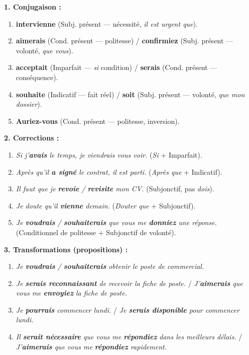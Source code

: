 \documentclass[11pt]{article}
\begin{document}
\begin{corrige}
\textbf{1. Conjugaison :}
\begin{enumerate}
    \item \textbf{intervienne} (Subj. présent — nécessité, \emph{il est urgent que}).
    \item \textbf{aimerais} (Cond. présent — politesse) / \textbf{confirmiez} (Subj. présent — volonté, \emph{que vous}).
    \item \textbf{acceptait} (Imparfait — \emph{si} condition) / \textbf{serais} (Cond. présent — conséquence).
    \item \textbf{souhaite} (Indicatif — fait réel) / \textbf{soit} (Subj. présent — volonté, \emph{que mon dossier}).
    \item \textbf{Auriez-vous} (Cond. présent — politesse, inversion).
\end{enumerate}

\textbf{2. Corrections :}
\begin{enumerate}
    \item \emph{Si j'\textbf{avais} le temps, je viendrais vous voir.} (\emph{Si} + Imparfait).
    \item \emph{Après qu'il \textbf{a signé} le contrat, il est parti.} (\emph{Après que} + Indicatif).
    \item \emph{Il faut que je \textbf{revoie} / \textbf{revisite} mon CV.} (Subjonctif, pas \emph{dois}).
    \item \emph{Je doute qu'il \textbf{vienne} demain.} (\emph{Douter que} + Subjonctif).
    \item \emph{Je \textbf{voudrais} / \textbf{souhaiterais} que vous me \textbf{donniez} une réponse.} (Conditionnel de politesse + Subjonctif de volonté).
\end{enumerate}

\textbf{3. Transformations (propositions) :}
\begin{enumerate}
    \item \emph{Je \textbf{voudrais} / \textbf{souhaiterais} obtenir le poste de commercial.}
    \item \emph{Je \textbf{serais reconnaissant} de recevoir la fiche de poste.} / \emph{J'\textbf{aimerais} que vous me \textbf{envoyiez} la fiche de poste.}
    \item \emph{Je \textbf{pourrais} commencer lundi.} / \emph{Je \textbf{serais disponible} pour commencer lundi.}
    \item \emph{Il \textbf{serait nécessaire} que vous me \textbf{répondiez} dans les meilleurs délais.} / \emph{J'\textbf{aimerais} que vous me \textbf{répondiez} rapidement.}
\end{enumerate}
\end{corrige}
\end{document}
